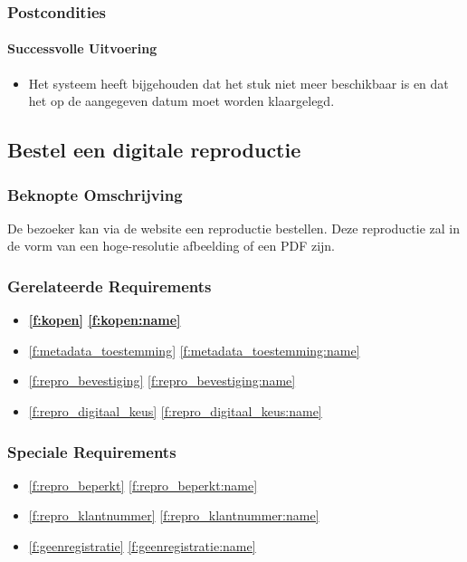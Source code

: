 \documentclass[a4paper,titlepage]{report}
\makeatletter
\def\namedlabel#1#2{
  \label{#1}
  \begingroup
   \def\@currentlabel{#2}%
   \label{#1:name}\endgroup
}
\def\namedref#1{\ref{#1} \ref{#1:name}}
\makeatother
\begin{document}
      \subsubsection{Postcondities}
        \paragraph{Successvolle Uitvoering}
          \begin{itemize}
            \item Het systeem heeft bijgehouden dat het stuk niet meer
            beschikbaar is en dat het op de aangegeven datum moet worden
            klaargelegd.
          \end{itemize}

    \pagebreak
    \subsection{Bestel een digitale reproductie}
    \namedlabel{u:bestel}{Bestel een digitale reproductie}
      \subsubsection{Beknopte Omschrijving}
        De bezoeker kan via de website een reproductie bestellen. Deze
        reproductie zal in de vorm van een hoge-resolutie afbeelding of een
        PDF zijn.
      \subsubsection{Gerelateerde Requirements}
        \begin{itemize}
          \item \textbf{\namedref{f:kopen}}
          \item \namedref{f:metadata_toestemming}
          \item \namedref{f:repro_bevestiging}
          \item \namedref{f:repro_digitaal_keus}
        \end{itemize}
      \subsubsection{Speciale Requirements}
        \begin{itemize}
          \item \namedref{f:repro_beperkt}
          \item \namedref{f:repro_klantnummer}
          \item \namedref{f:geenregistratie}
        \end{itemize}
\end{document}
